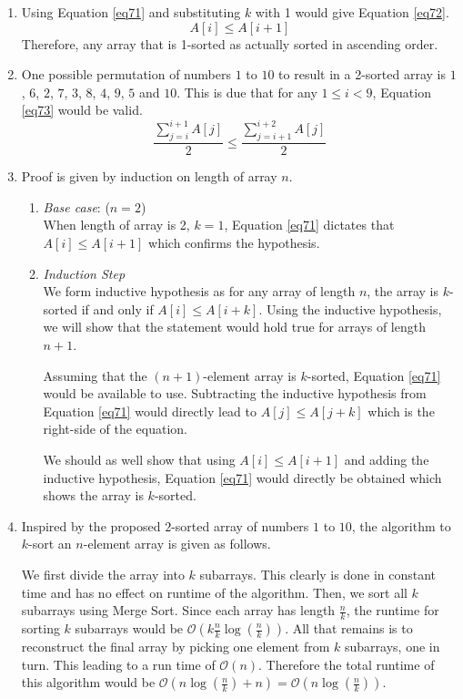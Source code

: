 \begin{enumerate}[label=(\alph*)]
\item Using Equation \ref{eq71} and substituting $k$ with 1 would give Equation \ref{eq72}.
\begin{equation}\label{eq72}
A[i] \leq A[i+1]
\end{equation}
Therefore, any array that is 1-sorted as actually sorted in ascending order.
\item One possible permutation of numbers $1$ to $10$ to result in a 2-sorted array is $1$, $6$, $2$, $7$, $3$, $8$, $4$, $9$, $5$ and $10$. This is due that for any $1 \leq i < 9$, Equation \ref{eq73} would be valid.
\begin{equation}\label{eq73}
\frac{\sum_{j=i}^{i + 1} A[j]}{2} \leq \frac{\sum_{j=i+1}^{i + 2} A[j]}{2}
\end{equation}
\item Proof is given by induction on length of array $n$.
\begin{enumerate}
\item[] \textit{Base case}: ($n = 2$)\\
When length of array is 2, $k = 1$, Equation \ref{eq71} dictates that $A[i] \leq A[i+1]$ which confirms the hypothesis.
\item[] \textit{Induction Step}\\
We form inductive hypothesis as for any array of length $n$, the array is $k$-sorted if and only if $A[i] \leq A[i+k]$. Using the inductive hypothesis, we will show that the statement would hold true for arrays of length $n + 1$. 

Assuming that the $(n+1)$-element array is $k$-sorted, Equation \ref{eq71} would be available to use. Subtracting the inductive hypothesis from Equation \ref{eq71} would directly lead to $A[j] \leq A[j+k]$ which is the right-side of the equation.

We should as well show that using $A[i] \leq A[i+1]$ and adding the inductive hypothesis, Equation \ref{eq71} would directly be obtained which shows the array is $k$-sorted.
\end{enumerate}
\item Inspired by the proposed $2$-sorted array of numbers $1$ to $10$, the algorithm to $k$-sort an $n$-element array is given as follows.

We first divide the array into $k$ subarrays. This clearly is done in constant time and has no effect on runtime of the algorithm. Then, we sort all $k$ subarrays using Merge Sort. Since each array has length $\frac{n}{k}$, the runtime for sorting $k$ subarrays would be $\mathcal{O}(k\frac{n}{k}\log(\frac{n}{k}))$. All that remains is to reconstruct the final array by picking one element from $k$ subarrays, one in turn. This leading to a run time of $\mathcal{O}(n)$. Therefore the total runtime of this algorithm would be $\mathcal{O}(n \log(\frac{n}{k}) + n ) = \mathcal{O}(n \log(\frac{n}{k}) )$.
\end{enumerate}
